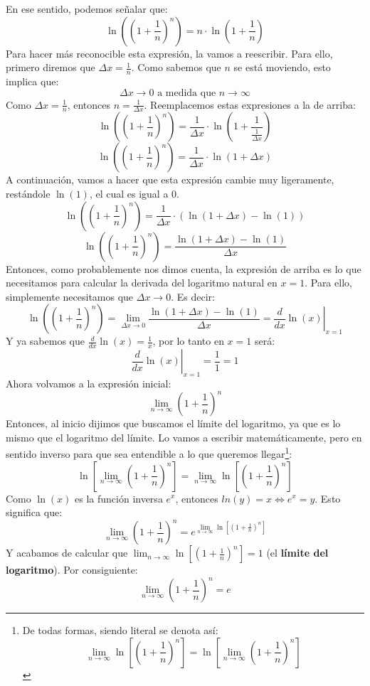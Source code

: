 \documentclass[12pt]{article}
\begin{document}
En ese sentido, podemos señalar que:
\[\ln\left(\left(1 + \frac{1}{n}\right)^{n}\right) = n \cdot \ln\left(1 + \frac{1}{n}\right)\]
Para hacer más reconocible esta expresión, la vamos a reescribir. Para ello, primero diremos que $\Delta x = \frac{1}{n}$. Como sabemos que $n$ se está moviendo, esto implica que:
\[\Delta x \to 0 \text{ a medida que } n \to \infty\]
Como $\Delta x = \frac{1}{n}$, entonces $n = \frac{1}{\Delta x}$. Reemplacemos estas expresiones a la de arriba:
\[\ln\left(\left(1 + \frac{1}{n}\right)^{n}\right) = \frac{1}{\Delta x} \cdot \ln\left(1 + \frac{1}{\frac{1}{\Delta x}}\right)\]
\[\ln\left(\left(1 + \frac{1}{n}\right)^{n}\right) = \frac{1}{\Delta x} \cdot \ln(1 + \Delta x)\]
A continuación, vamos a hacer que esta expresión cambie muy ligeramente, restándole $\ln(1)$, el cual es igual a $0$.
\[\ln\left(\left(1 + \frac{1}{n}\right)^{n}\right) = \frac{1}{\Delta x} \cdot (\ln(1 + \Delta x) - \ln(1))\]
\[\ln\left(\left(1 + \frac{1}{n}\right)^{n}\right) = \frac{\ln(1 + \Delta x) - \ln(1)}{\Delta x}\]
Entonces, como probablemente nos dimos cuenta, la expresión de arriba es lo que necesitamos para calcular la derivada del logaritmo natural en $x = 1$. Para ello, simplemente necesitamos que $\Delta x \to 0$. Es decir:
\[\ln\left(\left(1 + \frac{1}{n}\right)^{n}\right) = \lim_{\Delta x \to 0} \frac{\ln(1 + \Delta x) - \ln(1)}{\Delta x} = \left. \frac{d}{dx} \ln(x) \right|_{x = 1}\]
Y ya sabemos que $\frac{d}{dx} \ln(x) = \frac{1}{x}$, por lo tanto en $x = 1$ será:
\[\left. \frac{d}{dx} \ln(x) \right|_{x = 1} = \frac{1}{1} = 1\]
Ahora volvamos a la expresión inicial:
\[\lim_{n \to \infty} \left(1 + \frac{1}{n}\right)^{n}\]
Entonces, al inicio dijimos que buscamos el límite del logaritmo, ya que es lo mismo que el logaritmo del límite. Lo vamos a escribir matemáticamente, pero en sentido inverso para que sea entendible a lo que queremos llegar\footnote{De todas formas, siendo literal se denota así: \[\lim_{n \to \infty} \ln\left[\left(1 + \frac{1}{n}\right)^{n}\right] = \ln \left[\lim_{n \to \infty} \left(1 + \frac{1}{n}\right)^{n}\right]\]}:
\[\ln \left[\lim_{n \to \infty} \left(1 + \frac{1}{n}\right)^{n}\right] = \lim_{n \to \infty} \ln \left[\left(1 + \frac{1}{n}\right)^{n}\right]\]
Como $\ln(x)$ es la función inversa $e^{x}$, entonces $ln(y) = x \iff e^{x} = y$. Esto significa que:
\[\lim_{n \to \infty} \left(1 + \frac{1}{n}\right)^{n} = e^{\lim_{n \to \infty} \ln \left[\left(1 + \frac{1}{n}\right)^{n}\right]}\]
Y acabamos de calcular que $\lim_{n \to \infty} \ln \left[\left(1 + \frac{1}{n}\right)^{n}\right] = 1$ (el \textbf{límite del logaritmo}). Por consiguiente:
\[\lim_{n \to \infty} \left(1 + \frac{1}{n}\right)^{n} = e\]
\end{document}
